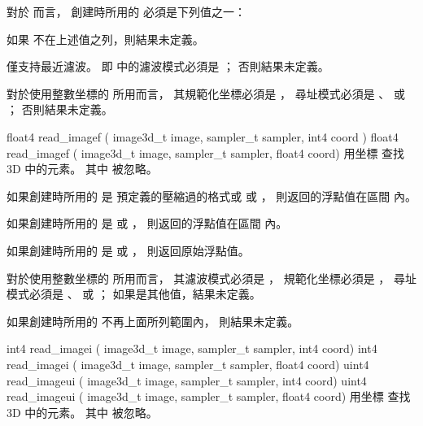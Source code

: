 對於  而言，
創建時所用的  必須是下列值之一：
\startigBase[indentnext=no]
\item {}
\item {}
\item {}
\stopigBase
如果  不在上述值之列，則結果未定義。

 僅支持最近濾波。
即  中的濾波模式必須是 ；
否則結果未定義。

對於使用整數坐標的  所用而言，
其規範化坐標必須是 ，
尋址模式必須是 、 
 或 ；
否則結果未定義。
\stopbuffer

float4 read_imagef (
	image3d_t image,
	sampler_t sampler,
	int4 coord )
float4 read_imagef (
	image3d_t image,
	sampler_t sampler,
	float4 coord)
\stopbuffer
{}
用坐標 
 查找 3D   中的元素。
其中  被忽略。

如果創建時所用的  是
預定義的壓縮過的格式或  或 ，
則返回的浮點值在區間 \math{[0.0 \cdots 1.0]} 內。

如果創建時所用的  是
  或 ，
則返回的浮點值在區間 \math{[-1.0 \cdots 1.0]} 內。

如果創建時所用的  是
  或 ，
則返回原始浮點值。

對於使用整數坐標的  所用而言，
其濾波模式必須是 ，
規範化坐標必須是 ，
尋址模式必須是 、 
 或 ；
如果是其他值，結果未定義。

如果創建時所用的  不再上面所列範圍內，
則結果未定義。
\stopbuffer

int4 read_imagei (
	image3d_t image,
	sampler_t sampler,
	int4 coord)
int4 read_imagei (
	image3d_t image,
	sampler_t sampler,
	float4 coord)
uint4 read_imageui (
	image3d_t image,
	sampler_t sampler,
	int4 coord)
uint4 read_imageui (
	image3d_t image,
	sampler_t sampler,
	float4 coord)
\stopbuffer
{}
用坐標  查找
 3D   中的元素。
其中  被忽略。

